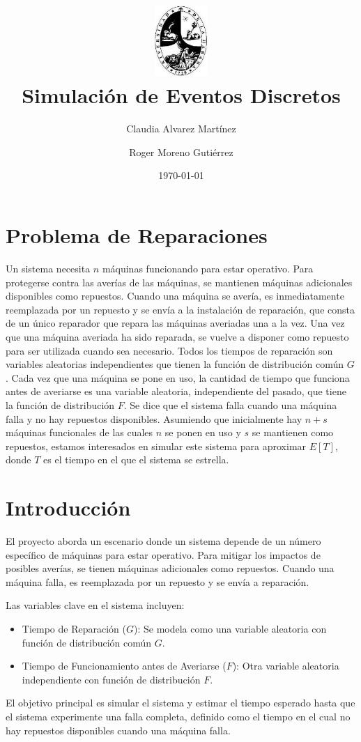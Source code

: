 \documentclass[12pt]{article}
\title{
    \vspace{1cm}
    \includegraphics[width=2cm]{logo_universidad.jpg}
    \vspace{1cm}\\
    \textbf{Simulación de Eventos Discretos}
  }
\author{Claudia Alvarez Martínez \and Roger Moreno Gutiérrez}
\date{\today}
\begin{document}
\maketitle
\clearpage
{}


\section{Problema de Reparaciones}
Un sistema necesita $n$ máquinas funcionando para estar operativo. Para protegerse
contra las averías de las máquinas, se mantienen máquinas adicionales disponibles como repuestos.
Cuando una máquina se avería, es inmediatamente reemplazada por un repuesto y se envía a la 
instalación de reparación, que consta de un único reparador que repara las máquinas averiadas una a la vez.
Una vez que una máquina averiada ha sido reparada, se vuelve a disponer como repuesto para ser utilizada 
cuando sea necesario.
Todos los tiempos de reparación son variables aleatorias independientes que tienen la función 
de distribución común $G$. Cada vez que una máquina se pone en uso, la cantidad de tiempo 
que funciona antes de averiarse es una variable aleatoria, independiente del pasado, 
que tiene la función de distribución $F$.
Se dice que el sistema falla cuando una máquina falla y no hay repuestos disponibles.
Asumiendo que inicialmente hay $n+s$ máquinas funcionales de las cuales $n$ se ponen en uso y $s$ 
se mantienen como repuestos, estamos interesados en simular este sistema para aproximar $E[T]$, donde $T$
es el tiempo en el que el sistema se estrella.




\section{Introducción}
El proyecto aborda un escenario donde un sistema depende de un número específico de máquinas para estar operativo. 
Para mitigar los impactos de posibles averías, se tienen máquinas adicionales como repuestos. 
Cuando una máquina falla, es reemplazada por un repuesto y se envía a reparación.

Las variables clave en el sistema incluyen:
\begin{itemize}
  \item Tiempo de Reparación ($G$): Se modela como una variable aleatoria con función de distribución común $G$.
  \item Tiempo de Funcionamiento antes de Averiarse ($F$): Otra variable aleatoria independiente con función de distribución $F$.
\end{itemize}
El objetivo principal es simular el sistema y estimar el tiempo esperado hasta que el sistema experimente una falla completa, 
definido como el tiempo en el cual no hay repuestos disponibles cuando una máquina falla.
\end{document}

